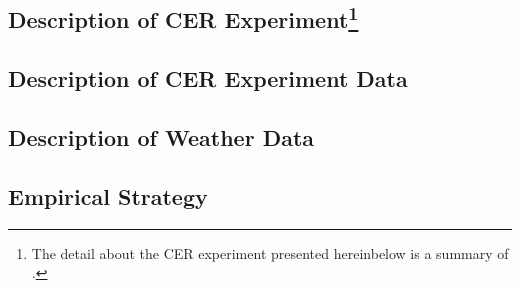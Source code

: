 \subsection[Description of CER Experiment]{Description of CER Experiment\footnote{The detail about the CER experiment presented hereinbelow is a summary of \cite{Electricity-Smart-Metering-Customer-Behaviour-Trials-Findings-Report_CER_2011}.}}
\label{SubSection:Description-of-CER-Experiment}



\subsection{Description of CER Experiment Data}
\label{SubSection:Description-of-CER-Experiment-Data}



\subsection{Description of Weather Data}
\label{SubSection:Description-of-Weather-Data}



\subsection{Empirical Strategy}
\label{SubSection:Empirical-Strategy}

